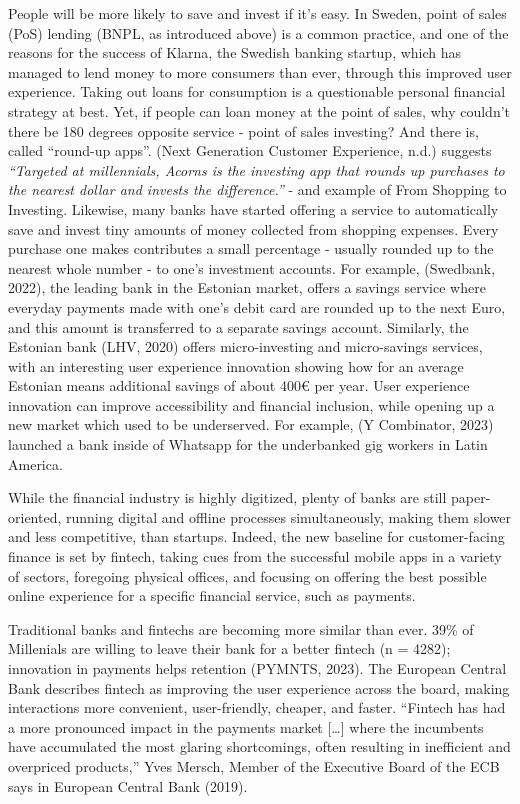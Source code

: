 \documentclass[
  12pt,
  letterpaper,
  DIV=11,
  numbers=noendperiod]{scrartcl}
\begin{document}
People will be more likely to save and invest if it's easy. In Sweden,
point of sales (PoS) lending (BNPL, as introduced above) is a common
practice, and one of the reasons for the success of Klarna, the Swedish
banking startup, which has managed to lend money to more consumers than
ever, through this improved user experience. Taking out loans for
consumption is a questionable personal financial strategy at best. Yet,
if people can loan money at the point of sales, why couldn't there be
180 degrees opposite service - point of sales investing? And there is,
called ``round-up apps''. (Next Generation Customer Experience, n.d.)
suggests \emph{``Targeted at millennials, Acorns is the investing app
that rounds up purchases to the nearest dollar and invests the
difference.''} - and example of From Shopping to Investing. Likewise,
many banks have started offering a service to automatically save and
invest tiny amounts of money collected from shopping expenses. Every
purchase one makes contributes a small percentage - usually rounded up
to the nearest whole number - to one's investment accounts. For example,
(Swedbank, 2022), the leading bank in the Estonian market, offers a
savings service where everyday payments made with one's debit card are
rounded up to the next Euro, and this amount is transferred to a
separate savings account. Similarly, the Estonian bank (LHV, 2020)
offers micro-investing and micro-savings services, with an interesting
user experience innovation showing how for an average Estonian means
additional savings of about 400€ per year. User experience innovation
can improve accessibility and financial inclusion, while opening up a
new market which used to be underserved. For example, (Y Combinator,
2023) launched a bank inside of Whatsapp for the underbanked gig workers
in Latin America.

While the financial industry is highly digitized, plenty of banks are
still paper-oriented, running digital and offline processes
simultaneously, making them slower and less competitive, than startups.
Indeed, the new baseline for customer-facing finance is set by fintech,
taking cues from the successful mobile apps in a variety of sectors,
foregoing physical offices, and focusing on offering the best possible
online experience for a specific financial service, such as payments.

Traditional banks and fintechs are becoming more similar than ever. 39\%
of Millenials are willing to leave their bank for a better fintech (n =
4282); innovation in payments helps retention (PYMNTS, 2023). The
European Central Bank describes fintech as improving the user experience
across the board, making interactions more convenient, user-friendly,
cheaper, and faster. ``Fintech has had a more pronounced impact in the
payments market {[}\ldots{]} where the incumbents have accumulated the
most glaring shortcomings, often resulting in inefficient and overpriced
products,'' Yves Mersch, Member of the Executive Board of the ECB says
in European Central Bank (2019).
\end{document}
